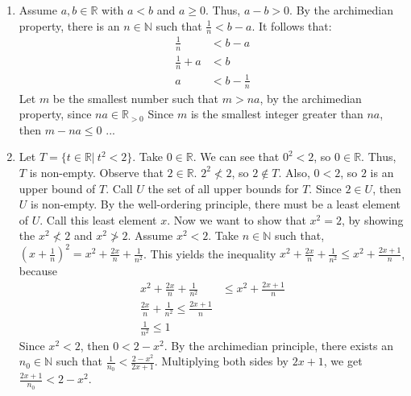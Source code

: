 \documentclass{article}
\theoremstyle{problem}
\theoremstyle{plain}
\theoremstyle{remark}
\begin{document}
\begin{enumerate}
\item 
  Assume $a,b \in \mathbb{R}$ with $a < b$ and $a \geq 0$. Thus, $a - b > 0$.
  By the archimedian property, there is an $n \in \mathbb{N}$ such that $\frac{1}{n} < b - a$.
  It follows that:
  \begin{align*}
    \frac{1}{n} &< b - a\\
    \frac{1}{n} + a &< b\\
    a &< b - \frac{1}{n}
  \end{align*}
  Let $m$ be the smallest number such that $m > na$, 
  by the archimedian property, since $na \in \mathbb{R}_{>0}$
  Since $m$ is the smallest integer greater than $na$, then $m - na \leq 0$
  ...
\item %
  Let $T = \{t \in \mathbb{R}|\ t^2 < 2\}$.
  Take $0 \in \mathbb{R}$. 
  We can see that $0^2 < 2$, so $0 \in \mathbb{R}$. 
  Thus, $T$ is non-empty.
  Observe that $2 \in \mathbb{R}$.
  $2^2 \not < 2$, so $2 \not \in T$.
  Also, $0 < 2$, so $2$ is an upper bound of $T$. 
  Call $U$ the set of all upper bounds for $T$.
  Since $2 \in U$, then $U$ is non-empty.
  By the well-ordering principle, there must be a least element of $U$.
  Call this least element $x$.
  Now we want to show that $x^2 = 2$, by showing the $x^2 \not < 2$ and $x^2 \not > 2$.
  Assume $x^2 < 2$.
  Take $n \in \mathbb{N}$ such that, $(x + \frac{1}{n})^2 = x^2 + \frac{2x}{n} + \frac{1}{n^2}$.
  This yields the inequality $x^2 + \frac{2x}{n} + \frac{1}{n^2} \leq x^2 + \frac{2x+1}{n}$, because
  \begin{align*}
    x^2 + \frac{2x}{n} + \frac{1}{n^2} &\leq x^2 + \frac{2x+1}{n}\\
    \frac{2x}{n} + \frac{1}{n^2} \leq \frac{2x+1}{n}\\
    \frac{1}{n^2} \leq 1
  \end{align*}  
  Since $x^2 < 2$, then $0 < 2 - x^2$.
  By the archimedian principle, there exists an $n_0 \in \mathbb{N}$ such that $\frac{1}{n_0} < \frac{2 - x^2}{2x+1}$.
  Multiplying both sides by $2x+1$, we get $\frac{2x + 1}{n_0} < 2 - x^2$.

\end{enumerate}
\end{document}
